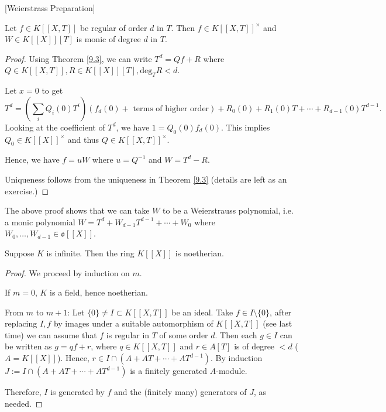 
\begin{corollary}\label{9.4}[Weierstrass Preparation] %

Let $f\in K[[X,T]]$ be regular of order $d$ in $T$.
Then $f\in K[[X,T]]^\times$ and $W\in K[[X]][T]$ is monic of degree $d$ in $T$.
 \end{corollary}

\begin{proof} %

Using Theorem \ref{9.3}, we can write $T^d = Qf+R$ where $Q\in K[[X,T]], R\in K[[X]][T], \mathrm{deg}_TR < d$.

Let $x=0$ to get
$$T^d = \left( \sum_i Q_i(0) T^i \right) (f_d(0) + \textrm{ terms of higher order} )
+ R_0(0) + R_1(0) T + \cdots + R_{d-1}(0) T^{d-1}.$$
Looking at the coefficient of $T^d$, we have $1 = Q_0(0) f_d(0)$.
This implies $Q_0 \in K[[X]]^\times$ and thus $Q\in K[[X,T]]^\times$.

Hence, we have $f = uW$ where $u = Q^{-1}$ and $W = T^d - R$.

Uniqueness follows from the uniqueness in Theorem \ref{9.3} (details are left as an exercise.)
 \end{proof}

\begin{remark}
The above proof shows that we can take $W$ to be a Weierstrauss polynomial, i.e. a monic polynomial
$W = T^d + W_{d-1} T^{d-1} + \cdots + W_0$ where $W_0,\ldots, W_{d-1}\in \mathfrak{o}[[X]]$.
\end{remark}

\begin{corollary} %
Suppose $K$ is infinite. Then the ring $K[[X]]$ is noetherian.
 \end{corollary}

\begin{proof} %
We proceed by induction on $m$.

If $m=0$, $K$ is a field, hence noetherian.

From $m$ to $m+1$:
Let $\{0\} \neq I \subset K[[X,T]]$ be an ideal.
Take $f\in I\setminus \{0\}$, after replacing $I,f$ by images under a suitable automorphism of $K[[X,T]]$
(see last time) we can assume that $f$ is regular in $T$ of some order $d$.
Then each $g\in I$ can be written as $g = qf + r$, where $q\in K[[X,T]]$ and $r\in A[T]$ is of degree $<d$ ($A = K[[X]]$).
Hence, $r\in I \cap (A + AT + \cdots + AT^{d-1})$. By induction $J:= I\cap (A + AT + \cdots + AT^{d-1})$ is a finitely generated $A$-module.

Therefore, $I$ is generated by $f$ and the (finitely many) generators of $J$, as needed.
 \end{proof}

